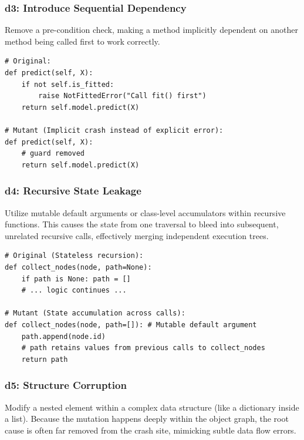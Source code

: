 \documentclass[11pt]{article}
\begin{document}
\subsubsection*{d3: Introduce Sequential Dependency}
Remove a pre-condition check, making a method implicitly dependent on another method being called first to work correctly.

\begin{listing}[H]
\begin{verbatim}
# Original:
def predict(self, X):
    if not self.is_fitted:
        raise NotFittedError("Call fit() first")
    return self.model.predict(X)

# Mutant (Implicit crash instead of explicit error):
def predict(self, X):
    # guard removed
    return self.model.predict(X)
\end{verbatim}
\caption{d3: Removing sequential preconditions}
\label{code:d3}
\end{listing}
\subsubsection*{d4: Recursive State Leakage}
Utilize mutable default arguments or class-level accumulators within recursive functions. This causes the state from one traversal to bleed into subsequent, unrelated recursive calls, effectively merging independent execution trees.

\begin{listing}[h!]
\begin{verbatim}
# Original (Stateless recursion):
def collect_nodes(node, path=None):
    if path is None: path = []
    # ... logic continues ...

# Mutant (State accumulation across calls):
def collect_nodes(node, path=[]): # Mutable default argument
    path.append(node.id)
    # path retains values from previous calls to collect_nodes
    return path
\end{verbatim}
\caption{d4: Interference between recursive calls}
\label{code:d4}
\end{listing}
\subsubsection*{d5: Structure Corruption}
Modify a nested element within a complex data structure (like a dictionary inside a list). Because the mutation happens deeply within the object graph, the root cause is often far removed from the crash site, mimicking subtle data flow errors.
\end{document}
